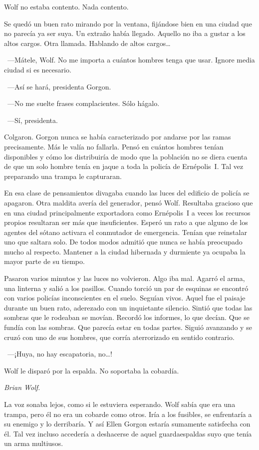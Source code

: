 Wolf no estaba contento. Nada contento.

Se quedó un buen rato mirando por la ventana, fijándose bien en una ciudad que no parecía ya ser suya. Un extraño había llegado. Aquello no iba a gustar a los altos cargos. Otra llamada. Hablando de altos cargos\dots{}

~---Mátele, Wolf. No me importa a cuántos hombres tenga que usar. Ignore media ciudad si es necesario.

~---Así se hará, presidenta Gorgon.

~---No me suelte frases complacientes. Sólo hágalo.

~---Sí, presidenta.

Colgaron. Gorgon nunca se había caracterizado por andarse por las ramas precisamente. Más le valía no fallarla. Pensó en cuántos hombres tenían disponibles y cómo los distribuiría de modo que la población no se diera cuenta de que un solo hombre tenía en jaque a toda la policía de Ernépolis~I. Tal vez preparando una trampa le capturaran.

En esa clase de pensamientos divagaba cuando las luces del edificio de policía se apagaron. Otra maldita avería del generador, pensó Wolf. Resultaba gracioso que en una ciudad principalmente exportadora como Ernépolis~I a veces los recursos propios resultaran ser más que insuficientes. Esperó un rato a que alguno de los agentes del sótano activara el conmutador de emergencia. Tenían que reinstalar uno que saltara solo. De todos modos admitió que nunca se había preocupado mucho al respecto. Mantener a la ciudad hibernada y durmiente ya ocupaba la mayor parte de su tiempo.

Pasaron varios minutos y las luces no volvieron. Algo iba mal. Agarró el arma, una linterna y salió a los pasillos. Cuando torció un par de esquinas se encontró con varios policías inconscientes en el suelo. Seguían vivos. Aquel fue el paisaje durante un buen rato, aderezado con un inquietante silencio. Sintió que todas las sombras que le rodeaban se movían. Recordó los informes, lo que decían. Que se fundía con las sombras. Que parecía estar en todas partes. Siguió avanzando y se cruzó con uno de sus hombres, que corría aterrorizado en sentido contrario.

~---¡Huya, no hay escapatoria, no\dots{}!

Wolf le disparó por la espalda. No soportaba la cobardía.

\emph{Brian Wolf.}

La voz sonaba lejos, como si le estuviera esperando. Wolf sabía que era una trampa, pero él no era un cobarde como otros. Iría a los fusibles, se enfrentaría a su enemigo y lo derribaría. Y así Ellen Gorgon estaría sumamente satisfecha con él. Tal vez incluso accedería a deshacerse de aquel guardaespaldas suyo que tenía un arma multiusos.

